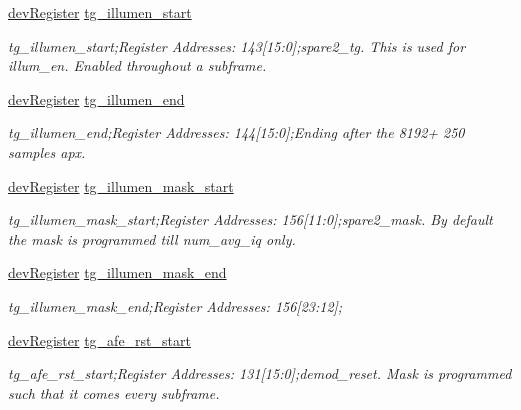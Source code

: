 \begin{DoxyCompactItemize}
\mbox{\hyperlink{classdev_register}{dev\+Register}} \mbox{\hyperlink{class_o_p_t3101_registers_a2af63a3f526f903e39856c598fece67c}{tg\+\_\+illumen\+\_\+start}}
\begin{DoxyCompactList}\small\item\em tg\+\_\+illumen\+\_\+start;Register Addresses\+: 143\mbox{[}15\+:0\mbox{]};spare2\+\_\+tg. This is used for illum\+\_\+en. Enabled throughout a subframe. \end{DoxyCompactList}\item 
\mbox{\hyperlink{classdev_register}{dev\+Register}} \mbox{\hyperlink{class_o_p_t3101_registers_a46954b0719efcf8149baf13d4b34d40c}{tg\+\_\+illumen\+\_\+end}}
\begin{DoxyCompactList}\small\item\em tg\+\_\+illumen\+\_\+end;Register Addresses\+: 144\mbox{[}15\+:0\mbox{]};Ending after the 8192+ 250 samples apx. \end{DoxyCompactList}\item 
\mbox{\hyperlink{classdev_register}{dev\+Register}} \mbox{\hyperlink{class_o_p_t3101_registers_a293592cb7a4cefc2b9db6e40b8d75bbc}{tg\+\_\+illumen\+\_\+mask\+\_\+start}}
\begin{DoxyCompactList}\small\item\em tg\+\_\+illumen\+\_\+mask\+\_\+start;Register Addresses\+: 156\mbox{[}11\+:0\mbox{]};spare2\+\_\+mask. By default the mask is programmed till num\+\_\+avg\+\_\+iq only. \end{DoxyCompactList}\item 
\mbox{\hyperlink{classdev_register}{dev\+Register}} \mbox{\hyperlink{class_o_p_t3101_registers_a43f4677b0d1e0ba15da82b7d896d8349}{tg\+\_\+illumen\+\_\+mask\+\_\+end}}
\begin{DoxyCompactList}\small\item\em tg\+\_\+illumen\+\_\+mask\+\_\+end;Register Addresses\+: 156\mbox{[}23\+:12\mbox{]}; \end{DoxyCompactList}\item 
\mbox{\hyperlink{classdev_register}{dev\+Register}} \mbox{\hyperlink{class_o_p_t3101_registers_a97a31fa1615c491405813f985a52427f}{tg\+\_\+afe\+\_\+rst\+\_\+start}}
\begin{DoxyCompactList}\small\item\em tg\+\_\+afe\+\_\+rst\+\_\+start;Register Addresses\+: 131\mbox{[}15\+:0\mbox{]};demod\+\_\+reset. Mask is programmed such that it comes every subframe. \end{DoxyCompactList}\item 

\end{DoxyCompactItemize}
